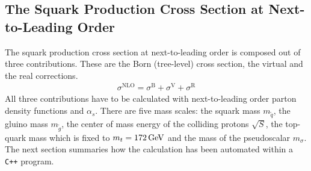 \subsection{The Squark Production Cross Section at Next-to-Leading Order}
The squark production cross section at next-to-leading order is composed out of three contributions. These are the Born (tree-level) cross section, the virtual and the real corrections. 
\begin{align}
\sigma^{\mathrm{NLO}} = \sigma^{\mathrm{B}} + \sigma^{\mathrm{V}} + \sigma^{\mathrm{R}}\label{eq:BVR}
\end{align}
All three contributions have to be calculated with next-to-leading order parton density functions and $\alpha_s$. There are five mass scales: the squark mass $m_{\tilde{q}}$, the gluino mass $m_{\tilde{g}}$, the center of mass energy of the colliding protons $\sqrt{S}$, the top-quark mass which is fixed to $m_t = \unit[172]{GeV}$ and the mass of the pseudoscalar $m_{\sigma}$. The next section summaries how the calculation has been automated within a \texttt{C++} program.

